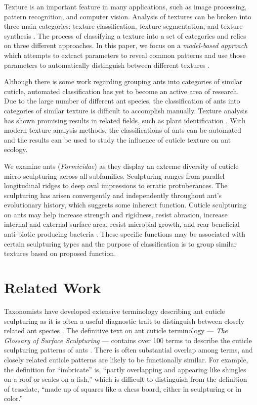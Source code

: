\documentclass{aci}
\begin{document}
Texture is an important feature in many applications, such as image processing,
pattern recognition, and computer vision. Analysis of textures can be broken
into three main categories: texture classification, texture segmentation, and
texture synthesis \cite{reed_review_1993}. The process of classifying a texture
into a set of categories and relies on three different approaches. In this
paper, we focus on a \textit{model-based approach} which attempts to extract
parameters to reveal common patterns and use those parameters to automatically
distinguish between different textures \cite{maillard_texture_2003}.

Although there is some work regarding grouping ants into categories of similar
cuticle, automated classification has yet to become an active area of research.
Due to the large number of different ant species, the classification of ants
into categories of similar texture is difficult to accomplish manually. Texture
analysis has shown promising results in related fields, such as plant
identification \cite{boudra_plant_2018}. With modern texture analysis methods,
the classifications of ants can be automated and the results can be used to
study the influence of cuticle texture on ant ecology.

We examine ants (\textit{Formicidae}) as they display an extreme diversity of
cuticle micro sculpturing across all subfamilies. Sculpturing ranges from
parallel longitudinal ridges to deep oval impressions to erratic protuberances.
The sculpturing has arisen convergently and independently throughout ant’s
evolutionary history, which suggests some inherent function. Cuticle sculpturing
on ants may help increase strength and rigidness, resist abrasion, increase
internal and external surface area, resist microbial growth, and rear beneficial
anti-biotic producing bacteria \cite{johnson_effect_2011,
  bruckner_relationship_2017, currie_coevolved_2006}. These specific functions may
be associated with certain sculpturing types and the purpose of classification
is to group similar textures based on proposed function.

\section{Related Work}
Taxonomists have developed extensive terminology describing ant cuticle
sculpturing as it is often a useful diagnostic trait to distinguish between
closely related ant species \cite{blaimer_taxonomy_2019,fisher_ants_2007}. The
definitive text on ant cuticle terminology — \textit{The Glossary of Surface
  Sculpturing} — contains over 100 terms to describe the cuticle sculpturing
patterns of ants \cite{harris_glossary_1979}. There is often substantial overlap
among terms, and closely related cuticle patterns are likely to be functionally
similar. For example, the definition for “imbricate” is, “partly overlapping and
appearing like shingles on a roof or scales on a fish,” which is difficult to
distinguish from the definition of tesselate, “made up of squares like a chess
board, either in sculpturing or in color.”
\end{document}
